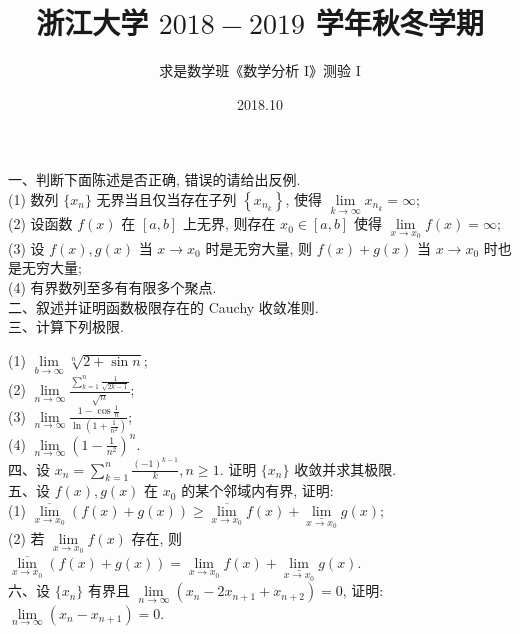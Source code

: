 \documentclass[UTF8]{ctexart}
\title{\textbf{浙江大学 $2018 - 2019$ 学年秋冬学期}}
\author{求是数学班《数学分析 I》测验 I}
\date{2018.10}
\begin{document}
\maketitle
一、判断下面陈述是否正确, 错误的请给出反例.
\\

(1) 数列 $\{x_n\}$ 无界当且仅当存在子列 $\displaystyle\left\{x_{n_k}\right\}$, 使得 $\displaystyle\lim\limits_{k\rightarrow\infty}x_{n_k}=\infty$;
\\

(2) 设函数 $f(x)$ 在 $[a,b]$ 上无界, 则存在 $x_0\in[a,b]$ 使得 $\displaystyle\lim\limits_{x\rightarrow x_0}f(x)=\infty$;
\\

(3) 设 $f(x),g(x)$ 当 $x\rightarrow x_0$ 时是无穷大量, 则 $f(x)+g(x)$ 当 $x\rightarrow x_0$ 时也是无穷大量;
\\

(4) 有界数列至多有有限多个聚点.
\\

二、叙述并证明函数极限存在的 Cauchy 收敛准则.
\\

三、计算下列极限.

(1) $\displaystyle\lim\limits_{b\rightarrow\infty}\sqrt[n]{2+\sin n}$;
\\

(2) $\displaystyle\lim\limits_{n\rightarrow\infty}\frac{\sum\limits_{k=1}^{n}\frac{1}{\sqrt{2k-1}}}{\sqrt{n}}$;
\\

(3) $\displaystyle\lim\limits_{n\rightarrow\infty}\frac{1-\cos\frac{1}{n}}{\ln(1+\frac{1}{n^2})}$;
\\

(4) $\displaystyle\lim\limits_{n\rightarrow\infty}\left(1-\frac{1}{n^2}\right)^n$.
\\

四、设 $\displaystyle x_n=\sum\limits_{k=1}^{n}\frac{(-1)^{k-1}}{k},n\geq1$. 证明 $\{x_n\}$ 收敛并求其极限.
\\

五、设 $f(x),g(x)$ 在 $x_0$ 的某个邻域内有界, 证明:
\\

(1) $\displaystyle\underset{x\rightarrow x_0}{\overline{\lim }}\left(f(x)+g(x)\right)\geq\underset{x\rightarrow x_0}{\overline{\lim }}f(x)+\underset{x\rightarrow x_0}{\underline{\lim }}g(x)$;
\\

(2) 若 $\displaystyle\lim\limits_{x\rightarrow x_0}f(x)$ 存在, 则 $\displaystyle\underset{x\rightarrow x_0}{\overline{\lim }}\left(f(x)+g(x)\right)=\lim\limits_{x\rightarrow x_0}f(x)+\underset{x\rightarrow x_0}{\underline{\lim }}g(x)$.
\\

六、设 $\{x_n\}$ 有界且 $\displaystyle\lim\limits_{n\rightarrow\infty}(x_n-2x_{n+1}+x_{n+2})=0$, 证明: $\displaystyle\lim\limits_{n\rightarrow\infty}(x_n-x_{n+1})=0$.
\end{document}
